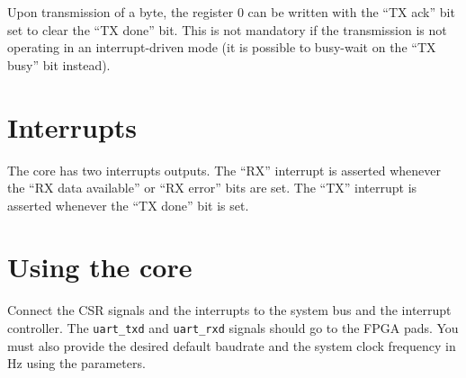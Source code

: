 \documentclass[a4paper,11pt]{article}
\begin{document}
Upon transmission of a byte, the register 0 can be written with the ``TX ack'' bit set to clear the ``TX done'' bit. This is not mandatory if the transmission is not operating in an interrupt-driven mode (it is possible to busy-wait on the ``TX busy'' bit instead).

\section{Interrupts}
The core has two interrupts outputs. The ``RX'' interrupt is asserted whenever the ``RX data available'' or ``RX error'' bits are set. The ``TX'' interrupt is asserted whenever the ``TX done'' bit is set.


\section{Using the core}
Connect the CSR signals and the interrupts to the system bus and the interrupt controller. The \verb!uart_txd! and \verb!uart_rxd! signals should go to the FPGA pads. You must also provide the desired default baudrate and the system clock frequency in Hz using the parameters.
\end{document}
